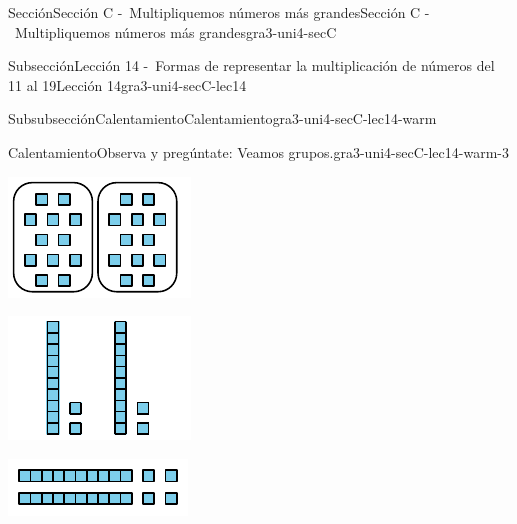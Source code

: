 \documentclass[twoside,10pt,]{article}
\begin{document}
\begin{sectionptx}{Sección}{Sección C -~Multipliquemos números más grandes}{}{Sección C -~Multipliquemos números más grandes}{}{}{gra3-uni4-secC}
\begin{subsectionptx}{Subsección}{Lección 14 -~Formas de representar la multiplicación de números del 11 al 19}{}{Lección 14}{}{}{gra3-uni4-secC-lec14}
\begin{subsubsectionptx}{Subsubsección}{Calentamiento}{}{Calentamiento}{}{}{gra3-uni4-secC-lec14-warm}
\begin{exploration}{Calentamiento}{Observa y pregúntate: Veamos grupos.}{gra3-uni4-secC-lec14-warm-3}
\begin{sidebyside}{3}{0}{0}{0}
\begin{sbspanel}{0.333333333333333}
\includegraphics[width=\linewidth]{external/svg-source/tikz-file-149346.pdf}
\end{sbspanel}%
\begin{sbspanel}{0.333333333333333}%
\includegraphics[width=\linewidth]{external/svg-source/tikz-file-149347.pdf}
\end{sbspanel}%
\begin{sbspanel}{0.333333333333333}%
\includegraphics[width=\linewidth]{external/svg-source/tikz-file-141822.pdf}

\end{sbspanel}
\end{sidebyside}
\end{exploration}
\end{subsubsectionptx}
\end{subsectionptx}
\end{sectionptx}
\end{document}
